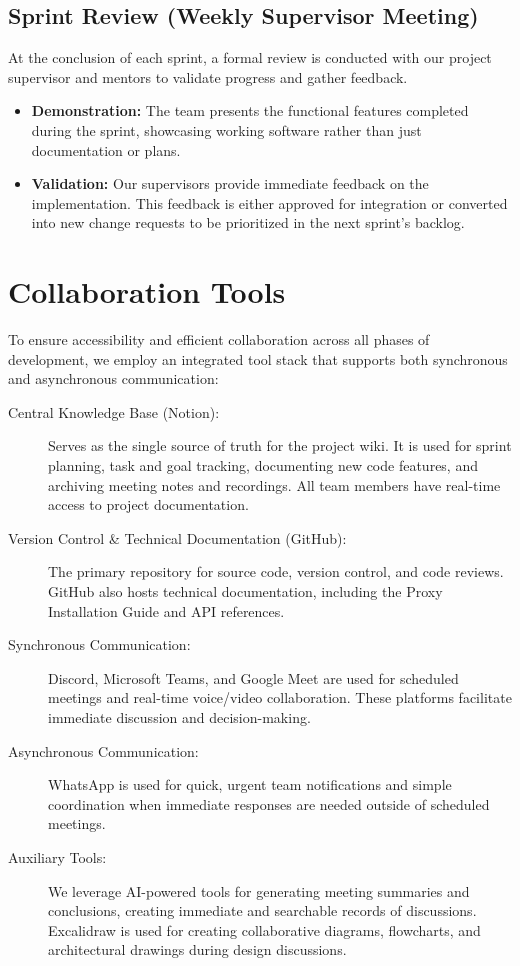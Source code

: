 \subsection{Sprint Review (Weekly Supervisor Meeting)}
At the conclusion of each sprint, a formal review is conducted with our project supervisor and mentors to validate progress and gather feedback.
\begin{itemize}
    \item \textbf{Demonstration:} The team presents the functional features completed during the sprint, showcasing working software rather than just documentation or plans.
    \item \textbf{Validation:} Our supervisors provide immediate feedback on the implementation. This feedback is either approved for integration or converted into new change requests to be prioritized in the next sprint's backlog.
\end{itemize}

\section{Collaboration Tools}
To ensure accessibility and efficient collaboration across all phases of development, we employ an integrated tool stack that supports both synchronous and asynchronous communication:
\begin{description}
    \item[Central Knowledge Base (Notion):] Serves as the single source of truth for the project wiki. It is used for sprint planning, task and goal tracking, documenting new code features, and archiving meeting notes and recordings. All team members have real-time access to project documentation.
    \item[Version Control \& Technical Documentation (GitHub):] The primary repository for source code, version control, and code reviews. GitHub also hosts technical documentation, including the Proxy Installation Guide and API references.
    \item[Synchronous Communication:] Discord, Microsoft Teams, and Google Meet are used for scheduled meetings and real-time voice/video collaboration. These platforms facilitate immediate discussion and decision-making.
    \item[Asynchronous Communication:] WhatsApp is used for quick, urgent team notifications and simple coordination when immediate responses are needed outside of scheduled meetings.
    \item[Auxiliary Tools:] We leverage AI-powered tools for generating meeting summaries and conclusions, creating immediate and searchable records of discussions. Excalidraw is used for creating collaborative diagrams, flowcharts, and architectural drawings during design discussions.
\end{description}

